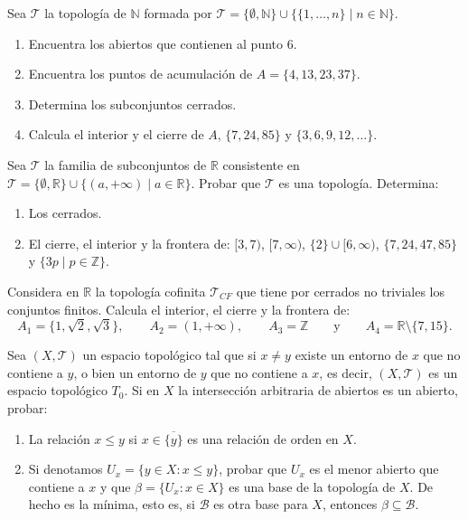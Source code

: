 \begin{ejer}[40]
Sea $\mathcal{T}$ la topología de $\mathbb{N}$ formada por $\mathcal{T} = \{\emptyset, \mathbb{N}\} \cup \{\{1, \dots, n\} \mid n \in \mathbb{N}\}$.
\begin{enumerate}
    \item[a)] Encuentra los abiertos que contienen al punto $6$.
    \item[b)] Encuentra los puntos de acumulación de $A = \{4, 13, 23, 37\}$.
    \item[c)] Determina los subconjuntos cerrados.
    \item[d)] Calcula el interior y el cierre de $A$, $\{7, 24, 85\}$ y $\{3, 6, 9, 12, \dots\}$.
\end{enumerate}
\end{ejer}

\begin{ejer}[41]
Sea $\mathcal{T}$ la familia de subconjuntos de $\mathbb{R}$ consistente en $\mathcal{T} = \{\emptyset, \mathbb{R}\} \cup \{(a, +\infty) \mid a \in \mathbb{R}\}$. Probar que $\mathcal{T}$ es una topología. Determina:
\begin{enumerate}
    \item[a)] Los cerrados.
    \item[b)] El cierre, el interior y la frontera de: $[3,7)$, $[7, \infty)$, $\{2\} \cup [6, \infty)$, $\{7, 24, 47, 85\}$ y $\{3p \mid p \in \mathbb{Z}\}$.
\end{enumerate}
\end{ejer}

\begin{ejer}[42]
Considera en $\mathbb{R}$ la topología cofinita $\mathcal{T}_{CF}$ que tiene por cerrados no triviales los conjuntos finitos. Calcula el interior, el cierre y la frontera de:
\[
    A_1 = \{1, \sqrt{2}, \sqrt{3}\}, \qquad A_2 = (1, +\infty), \qquad A_3 = \mathbb{Z} \qquad \text{y} \qquad A_4 = \mathbb{R} \setminus \{7, 15\}.
\]
\end{ejer}

\begin{ejer}[43]
Sea $(X, \mathcal{T})$ un espacio topológico tal que si $x \neq y$ existe un entorno de $x$ que no contiene a $y$, o bien un entorno de $y$ que no contiene a $x$, es decir, $(X, \mathcal{T})$ es un espacio topológico $T_0$. Si en $X$ la intersección arbitraria de abiertos es un abierto, probar:
\begin{enumerate}
    \item[a)] La relación $x \le y$ si $x \in \overline{\{y\}}$ es una relación de orden en $X$.
    \item[b)] Si denotamos $U_x = \{y \in X : x \le y\}$, probar que $U_x$ es el menor abierto que contiene a $x$ y que $\beta = \{U_x : x \in X\}$ es una base de la topología de $X$. De hecho es la mínima, esto es, si $\mathcal{B}$ es otra base para $X$, entonces $\beta \subseteq \mathcal{B}$.
\end{enumerate}
\end{ejer}

